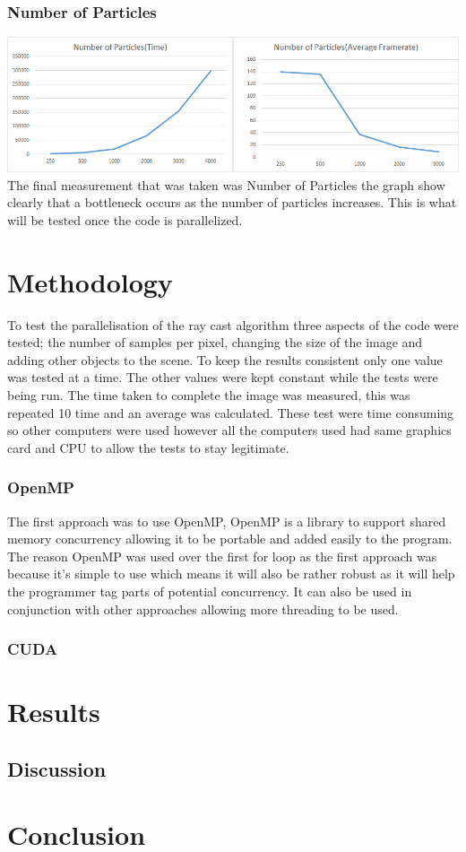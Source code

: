 \documentclass[12pt]{article}
\begin{document}
\subsubsection{ Number of Particles}
\newline
\includegraphics[scale=0.5]{pics/ianumber.png}
\newline
The final measurement that was taken was Number of Particles the graph show clearly that a bottleneck occurs as the number of particles increases. This is what will be tested once the code is parallelized. 
	
\section{Methodology}
To test the parallelisation of the ray cast algorithm three aspects of the code were tested; the number of samples per pixel, changing the size of the image and adding other objects to the scene. To keep the results consistent only one value was tested at a time. The other values were kept constant while the tests were being run. The time taken to complete the image was measured, this was repeated 10 time and an average was calculated. These test were time consuming so other computers were used however all the computers used had same graphics card and CPU to allow the tests to stay legitimate. 
	\subsubsection{OpenMP}
	The first approach was to use OpenMP, OpenMP is a library to support shared memory concurrency allowing it to be portable and added easily to the program. The reason OpenMP was used over the first for loop as the first approach was because it’s simple to use which means it will also be rather robust as it will help the programmer tag parts of potential concurrency. It can also be used in conjunction with other approaches allowing more threading to be used.
	\subsubsection{CUDA}

	
	\section{Results}
	\subsection{Discussion}
	
	\section{Conclusion}
	

	
\end{document}

